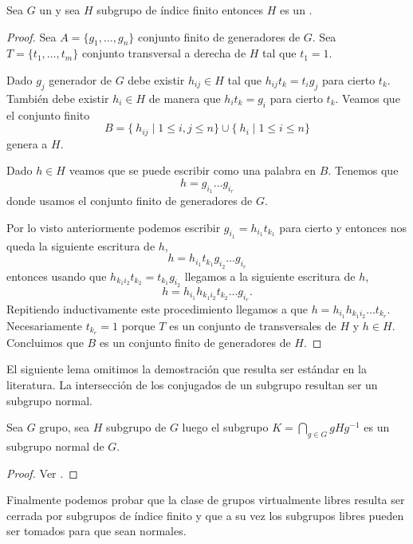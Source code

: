 \documentclass[tesis.tex]{subfiles}
\begin{document}
\begin{lema}\label{lema_subg_fg}
	Sea $G$ un \fg y sea $H$ subgrupo de índice finito entonces $H$ es un \fg.
\end{lema}
\begin{proof}
	Sea $A = \{g_1, \dots, g_n\}$ conjunto finito de generadores de $G$.
	Sea $T =\{t_1, \dots, t_m\}$ conjunto transversal a derecha de $H$ tal que $t_1=1$.
	
	Dado $g_j$ generador de $G$ debe existir $h_{ij} \in H$ tal que $h_{ij}t_{k} = t_ig_j$ para cierto $t_k$.
	También debe existir $h_i \in H$ de manera que $ h_i t_{k} = g_i$ para cierto $t_k$.
	Veamos que el conjunto finito 
	\[
	B = \{ \ h_{ ij}  \mid {1 \le i,j \le n } \} \cup \{ \ h_i \mid {1 \le i \le n} \}
	\]
	genera a $H$.
	
	Dado $h \in H$ veamos que se puede escribir como una palabra en $B$. 
	Tenemos que 
	\[
	h = g_{i_1}\dots g_{i_r}
	\]
	donde usamos el conjunto finito de generadores de $G$.
	
	Por lo visto anteriormente podemos escribir  $g_{i_1} = h_{i_1}t_{k_1}$ para cierto y entonces nos queda la siguiente escritura de $h$,
	\[
	h = h_{i_1}t_{k_1} g_{i_2}\dots g_{i_r}
	\]
	entonces usando que $h_{k_{1}i_{2}}t_{k_2} = t_{k_1}g_{i_2} $ llegamos a la siguiente escritura de $h$,
	\[
	h = h_{i_1}h_{k_{1}i_{2}}t_{k_2}\dots g_{i_r}.
	\]
	Repitiendo inductivamente este procedimiento llegamos a que $h =h_{i_1}h_{k_{1}i_{2}} \dots t_{k_r}$.
	Necesariamente $t_{k_r} = 1$ porque $T$ es un conjunto de transversales de $H$ y $h \in H$.
	Concluimos que $B$ es un conjunto finito de generadores de $H$.
	
\end{proof}


El siguiente lema omitimos la demostración que resulta ser estándar en la literatura.
La intersección de los conjugados de un subgrupo resultan ser un subgrupo normal.

\begin{lema}\label{lema_int_normal}
	Sea $G$ grupo, sea $H$ subgrupo de $G$ luego el subgrupo $K = \bigcap_{g \in G} gHg^{-1}$ es un subgrupo normal de $G$.
\end{lema}
\begin{proof}
	Ver \cite{}.
\end{proof}

Finalmente podemos probar que la clase de grupos virtualmente libres resulta ser cerrada por subgrupos de índice finito y que a su vez los subgrupos libres pueden ser tomados para que sean normales.
\end{document}
